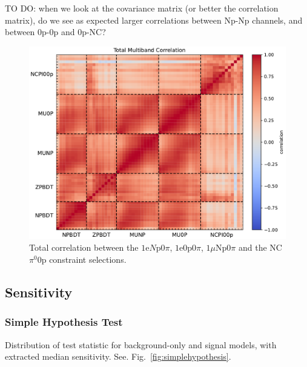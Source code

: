 TO DO: when we look at the covariance matrix (or better the correlation matrix), do we see as expected larger correlations between Np-Np channels, and between 0p-0p and 0p-NC?
\begin{figure}
    \centering
    \includegraphics[width=0.95\linewidth]{technote/SystematicsSensitivity/Figures/newconstraintscorrelations.pdf}
    \caption{Total correlation between the $1\mathrm{e}N\mathrm{p}0\pi$, $1\mathrm{e}0\mathrm{p}0\pi$, $1\mu\mathrm{Np}0\pi$ and the NC$\pi^0 0\mathrm{p}$ constraint selections.}
    \label{fig:sidebands-total-correlation}
\end{figure}

\newpage
\subsection{Sensitivity}
\label{sec:sensitivity}

\subsubsection{Simple Hypothesis Test}

Distribution of test statistic for background-only and signal models, with extracted median sensitivity. See. Fig.~\ref{fig:simplehypothesis}.

